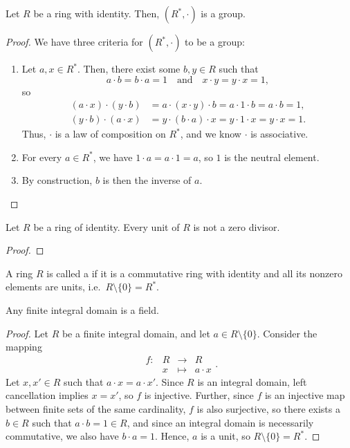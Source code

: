 \begin{prop}
Let $ R $ be a ring with identity. Then, $ (R^*,\cdot) $ is a group.
\end{prop}
\begin{proof}
We have three criteria for $ (R^*,\cdot) $ to be a group:
\begin{enumerate}
    \item Let $ a,x\in R^* $. Then, there exist some $ b,y\in R $ such that
    \begin{equation*}
        a\cdot b=b\cdot a=1 \quad\text{and}\quad x\cdot y=y\cdot x=1,
    \end{equation*}
    so
    \begin{align*}
        (a\cdot x)\cdot(y\cdot b) &= a\cdot(x\cdot y)\cdot b=a\cdot 1\cdot b=a\cdot b=1, \\
            (y\cdot b)\cdot(a\cdot x) &= y\cdot(b\cdot a)\cdot x=y\cdot 1\cdot x=y\cdot x=1.
    \end{align*}
    Thus, $ \cdot $ is a law of composition on $ R^* $, and we know $ \cdot $ is associative.

    \item For every $ a\in R^* $, we have $ 1\cdot a=a\cdot 1=a $, so $ 1 $ is the neutral element.
    
    \item By construction, $ b $ is then the inverse of $ a $.\qedhere
\end{enumerate}
\end{proof}

\begin{prop}
Let $ R $ be a ring of identity. Every unit of $ R $ is not a zero divisor.
\end{prop}
\begin{proof}
\end{proof}

\begin{defn}
A ring $ R $ is called a  if it is a commutative ring with identity and all its nonzero elements are units, i.e.\ $ R\setminus\{0\}=R^* $.
\end{defn}

\begin{thm}
Any finite integral domain is a field.
\end{thm}
\begin{proof}
Let $ R $ be a finite integral domain, and let $ a\in R\setminus\{0\} $. Consider the mapping
\begin{equation*}
    \begin{array}{rccc}
        f: & R & \to & R \\
        & x & \mapsto & a\cdot x
    \end{array}.
\end{equation*}
Let $ x,x'\in R $ such that $ a\cdot x=a\cdot x' $. Since $ R $ is an integral domain, left cancellation implies $ x=x' $, so $ f $ is injective. Further, since $ f $ is an injective map between finite sets of the same cardinality, $ f $ is also surjective, so there exists a $ b\in R $ such that $ a\cdot b=1\in R $, and since an integral domain is necessarily commutative, we also have $ b\cdot a=1 $. Hence, $ a $ is a unit, so $ R\setminus\{0\}=R^* $.
\end{proof}

